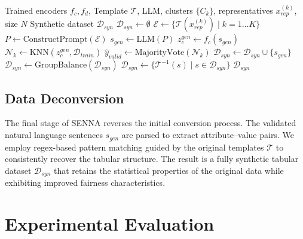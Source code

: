 \documentclass[runningheads]{llncs}
\begin{document}
\begin{algorithm}[t]
\caption{SENNA Synthetic Data Generation}
\label{alg:generation}
\begin{algorithmic}[1]
\Require Trained encoders $f_c, f_d$, Template $\mathcal{T}$, LLM, clusters $\{C_k\}$, representatives $x_{rep}^{(k)}$, size $N$
\Ensure Synthetic dataset $\mathcal{D}_{syn}$
\State $\mathcal{D}_{syn} \leftarrow \emptyset$
\State $\mathcal{E} \leftarrow \{\mathcal{T}(x_{rep}^{(k)}) \mid k=1 \dots K\}$ 
    \State $P \leftarrow \text{ConstructPrompt}(\mathcal{E})$
    \State $s_{gen} \leftarrow \text{LLM}(P)$ 
    \State $z_c^{gen} \leftarrow f_c(s_{gen})$
    \State $\mathcal{N}_k \leftarrow \text{KNN}(z_c^{gen}, \mathcal{D}_{train})$ 
    \State $\hat{y}_{valid} \leftarrow \text{MajorityVote}(\mathcal{N}_k)$
     
         \State $\mathcal{D}_{syn} \leftarrow \mathcal{D}_{syn} \cup \{s_{gen}\}$
    \EndIf
\EndWhile
\State $\mathcal{D}_{syn} \leftarrow \text{GroupBalance}(\mathcal{D}_{syn})$ 
\State $\mathcal{D}_{syn} \leftarrow \{\mathcal{T}^{-1}(s) \mid s \in \mathcal{D}_{syn}\}$ 
\State \Return $\mathcal{D}_{syn}$
\end{algorithmic}
\end{algorithm}

\subsection{Data Deconversion}

The final stage of SENNA reverses the initial conversion process.
The validated natural language sentences $s_{gen}$ are parsed to extract attribute--value pairs.
We employ regex-based pattern matching guided by the original templates $\mathcal{T}$ to consistently recover the tabular structure.
The result is a fully synthetic tabular dataset $\mathcal{D}_{syn}$ that retains the statistical properties of the original data while exhibiting improved fairness characteristics.


\section{Experimental Evaluation}
\label{sec:experiments}
\end{document}
